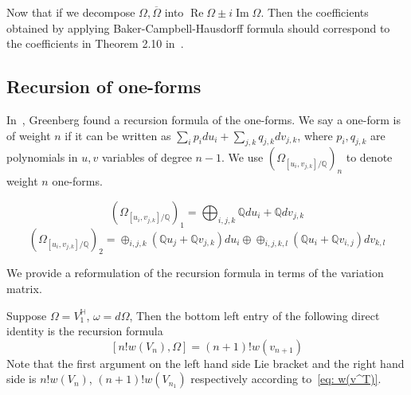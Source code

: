 Now that if we decompose $\Omega,\overline\Omega$ into $\operatorname{Re}\Omega\pm i\operatorname{Im}\Omega$. Then the coefficients obtained by applying Baker-Campbell-Hausdorff formula should correspond to the coefficients in Theorem 2.10 in~\cite{Zickert_HolomorphicPolylogarithmsAndBlochComplexes}.

\subsection{Recursion of one-forms}

In~\cite{ZackThesis}, Greenberg found a recursion formula of the one-forms. We say a one-form is of weight $n$ if it can be written as $\sum_ip_i du_i+\sum_{j,k}q_{j,k}dv_{j,k}$, where $p_i,q_{j,k}$ are polynomials in $u,v$ variables of degree $n-1$. We use  $\left(\Omega_{[u_i,v_{j,k}]/\mathbb Q}\right)_n$ to denote weight $n$ one-forms.

\begin{example}
\begin{equation}
\left(\Omega_{[u_i,v_{j,k}]/\mathbb Q}\right)_1=\bigoplus_{i,j,k}\mathbb Qdu_i+\mathbb Qdv_{j,k}
\end{equation}
\begin{equation}
\left(\Omega_{[u_i,v_{j,k}]/\mathbb Q}\right)_2=\oplus_{i,j,k}(\mathbb Qu_j+\mathbb Qv_{j,k})du_i\oplus\oplus_{i,j,k,l}(\mathbb Qu_i+\mathbb Qv_{i,j})dv_{k,l}
\end{equation}
\end{example}


We provide a reformulation of the recursion formula in terms of the variation matrix.

\begin{theorem}
Suppose $\Omega=V^{\mathbb H}_1$, $\omega=d\Omega$, Then the bottom left entry of the following direct identity is the recursion formula
\begin{equation}\label{eq: recursion formula}
[n!w(V_n),\Omega]=(n+1)!w(v_{n+1})
\end{equation}
Note that the first argument on the left hand side Lie bracket and the right hand side is $n!w(V_n)$, $(n+1)!w(V_{n_1})$ respectively according to~\eqref{eq: w(v^T)}.
\end{theorem}

